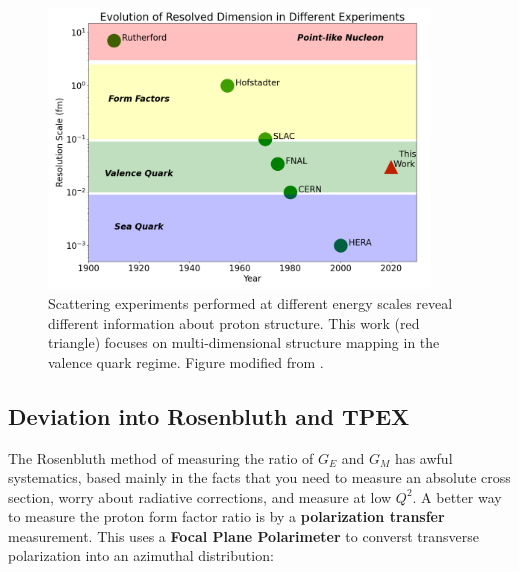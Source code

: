         \begin{figure}
            \centering
            \includegraphics[width=0.9\textwidth]{Chapters/Ch1-Intro/Ch1-Sec1-Background/pics/experiment_scales.png}
            \caption[Scattering Measurements at Different Scales]{Scattering experiments performed at different energy scales reveal different information about proton structure. This work (red triangle) focuses on multi-dimensional structure mapping in the valence quark regime. Figure modified from \parencite{Klein2005ResolvingHERA}.}
            \label{fig:experimentsVsscale}
        \end{figure}




\iffalse
       \subsection{Deviation into Rosenbluth and TPEX}
        
                
            The Rosenbluth method of measuring the ratio of $G_E$ and $G_M$ has awful systematics, based mainly in the facts that you need to measure an absolute cross section, worry about radiative corrections, and measure at low $Q^2$. A better way to measure the proton form factor ratio is by a \textbf{polarization transfer} measurement. This uses a \textbf{Focal Plane Polarimeter} to converst transverse polarization into an azimuthal distribution:
            
